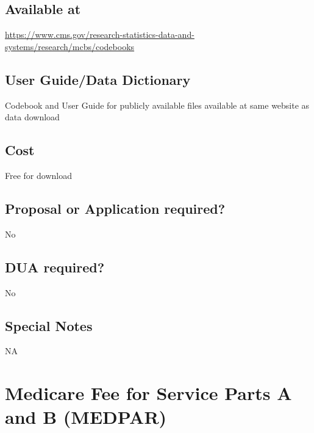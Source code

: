 \documentclass[
]{book}
\begin{document}
\hypertarget{available-at-37}{%
\section{Available at}\label{available-at-37}}

\url{https://www.cms.gov/research-statistics-data-and-systems/research/mcbs/codebooks}

\hypertarget{user-guidedata-dictionary-37}{%
\section{User Guide/Data Dictionary}\label{user-guidedata-dictionary-37}}

Codebook and User Guide for publicly available files available at same website as data download

\hypertarget{cost-37}{%
\section{Cost}\label{cost-37}}

Free for download

\hypertarget{proposal-or-application-required-37}{%
\section{Proposal or Application required?}\label{proposal-or-application-required-37}}

No

\hypertarget{dua-required-37}{%
\section{DUA required?}\label{dua-required-37}}

No

\hypertarget{special-notes-37}{%
\section{Special Notes}\label{special-notes-37}}

NA

\mainmatter

\hypertarget{medicare-fee-for-service-parts-a-and-b-medpar}{%
\chapter{Medicare Fee for Service Parts A and B (MEDPAR)}\label{medicare-fee-for-service-parts-a-and-b-medpar}}
\end{document}
